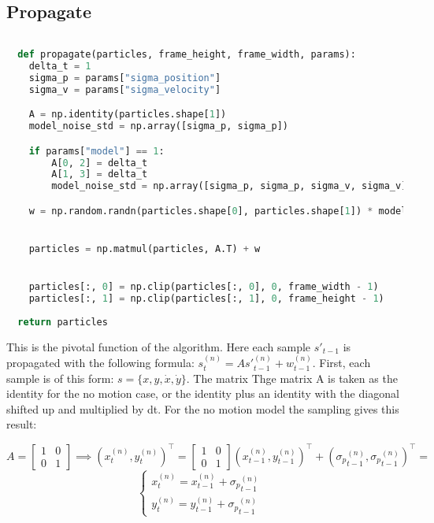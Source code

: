 \documentclass{ETHExercise}
\begin{document}
\newpage

\subsection{Propagate}

\begin{lstlisting}[language=Python, caption=propagate]
  
  def propagate(particles, frame_height, frame_width, params):
    delta_t = 1
    sigma_p = params["sigma_position"]
    sigma_v = params["sigma_velocity"]

    A = np.identity(particles.shape[1])
    model_noise_std = np.array([sigma_p, sigma_p])

    if params["model"] == 1:
        A[0, 2] = delta_t
        A[1, 3] = delta_t
        model_noise_std = np.array([sigma_p, sigma_p, sigma_v, sigma_v])

    w = np.random.randn(particles.shape[0], particles.shape[1]) * model_noise_std


    particles = np.matmul(particles, A.T) + w


    particles[:, 0] = np.clip(particles[:, 0], 0, frame_width - 1)
    particles[:, 1] = np.clip(particles[:, 1], 0, frame_height - 1)
      
  return particles

\end{lstlisting}
This is the pivotal function of the algorithm. Here each sample $s'_{t-1}$ 
is propagated with the following formula: $s^{(n)}_t = As'^{(n)}_{t-1} + w^{(n)}_{t-1}$.
First, each sample is of this form: $s=\{x, y, \dot{x}, \dot{y}\}$. The matrix 
Thge matrix A is taken as the identity for the no motion case, or the identity 
plus an identity with the diagonal shifted up and multiplied by dt.
For the no motion model the sampling gives this result:
\begin{center}
  $A = \begin{bmatrix}
    1 & 0\\
    0 & 1
  \end{bmatrix} \implies (x^{(n)}_t, y^{(n)}_t)^\top = \begin{bmatrix}
    1 & 0\\
    0 & 1
  \end{bmatrix} (x^{(n)}_{t-1}, y^{(n)}_{t-1})^\top + ({\sigma_p}^{(n)}_{t-1}, {\sigma_p}^{(n)}_{t-1})^\top=$\\
  \[
  \begin{cases}
    x^{(n)}_t = x^{(n)}_{t-1} + {\sigma_p}^{(n)}_{t-1}&\\
    y^{(n)}_t = y^{(n)}_{t-1} + {\sigma_p}^{(n)}_{t-1}&
  \end{cases}
  \]
\end{center}
\end{document}
